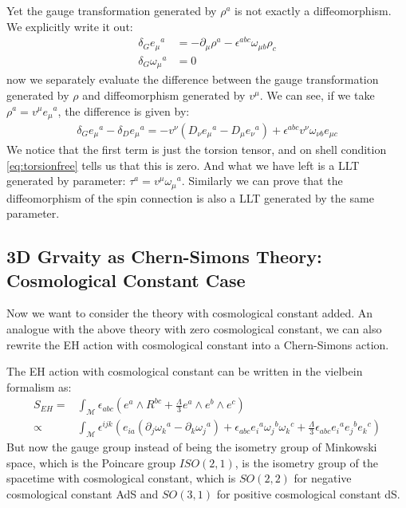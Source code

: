 Yet the gauge transformation generated by $ \rho^a
$ is not exactly a diffeomorphism. We explicitly write it out:
\begin{align}
  \delta_G e_\mu{}^a & = -\partial_\mu \rho^a - \epsilon^{abc}
  \omega_{\mu b} \rho_c \\
  \delta_G \omega_\mu{}^a & = 0
\end{align}
now we separately evaluate the difference between the gauge
transformation generated by $ \rho $ and diffeomorphism generated by
$ v^\mu $. We can see, if we take $ \rho^a = v^\mu e_\mu{}^a$, the
difference is given by:
\begin{align}
  \delta_G e_\mu{}^a - \delta_D e_\mu{}^a  =  - v^\nu (D_\nu
  e_\mu{}^a - D_\mu e_\nu{}^a)  + \epsilon^{abc}
  v^\nu \omega_{\nu b} e_{\mu c}
\end{align}
We notice that the first term is just the torsion tensor, and on
shell condition \cref{eq:torsionfree} tells us that this is zero. And
what we have left is a LLT generated by parameter: $ \tau^a = v^\mu
\omega_\mu{}^a $. Similarly we can prove that the diffeomorphism of
the spin connection is also a LLT generated by the same parameter.

\subsection{3D Grvaity as Chern-Simons Theory: Cosmological Constant Case}

Now we want to consider the theory with cosmological constant added.
An analogue with the above theory with zero cosmological constant, we
can also rewrite the EH action with cosmological constant into a
Chern-Simons action.

The EH action with cosmological constant can be written in the
vielbein formalism as:
\begin{align}
  S_{EH} =& \int_{\mathcal{M}} \epsilon_{abc} \left( e^a \wedge R^{bc} +
  \frac{\Lambda}{3} e^a \wedge e^b \wedge e^c \right) \\
  \propto & \int_{\mathcal{M}} \epsilon^{ijk} \left( e_{ia} (\partial_j
    \omega_k{}^a - \partial_{k} \omega_j{}^a) + \epsilon_{abc} e_i{}^a
    \omega_{j}{}^b \omega_{k}{}^c + \frac{\Lambda}{3} \epsilon_{abc}
  e_i{}^a e_j{}^b e_k{}^c \right)
\end{align}
But now the gauge group instead of being the
isometry group of Minkowski space, which is the Poincare group $
ISO(2,1) $, is the isometry group of the spacetime with cosmological
constant, which is $ SO(2,2) $ for negative cosmological constant AdS and
$ SO(3,1) $ for positive cosmological constant dS.

